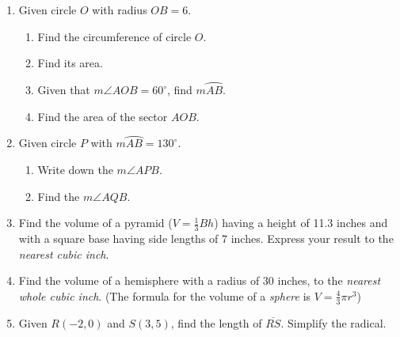 \documentclass[12pt, twoside]{article}
\begin{document}
\begin{enumerate}
\item Given circle $O$ with radius $OB=6$.
  \begin{multicols}{2}
   \raggedcolumns
   \begin{enumerate}
     \item Find the circumference of circle $O$. \vspace{1.7cm}
     \item Find its area.  \vspace{2cm}
     \item Given that $m\angle AOB=60^\circ$, find $m \wideparen{AB}$. \vspace{1cm}%
     \item Find the area of the sector $AOB$. \vspace{1.5cm}
   \end{enumerate}
  \end{multicols}  \vspace{3cm}

\item Given circle $P$ with $m \wideparen{AB}=130^\circ$.
  \begin{multicols}{2}
   \raggedcolumns
   \begin{enumerate}
     \item Write down the $m\angle APB$. \vspace{1.7cm}
     \item Find the $m\angle AQB$. \vspace{2cm}
   \end{enumerate}
  \end{multicols}
\newpage

\item Find the volume of a pyramid ($V=\frac{1}{3}Bh$) having a height of 11.3 inches and with a square base having side lengths of 7 inches. Express your result to the \emph{nearest cubic inch}. \vspace{5cm}

\item Find the volume of a hemisphere with a radius of 30 inches, to the \emph{nearest whole cubic inch}. (The formula for the volume of a \emph{sphere} is $V=\frac{4}{3}\pi r^3$)  \vspace{5cm}




     \item Given $R(-2,0)$ and $S(3,5)$, find the length of $\overline{RS}$. Simplify the radical.

 \end{enumerate}
\end{document}
